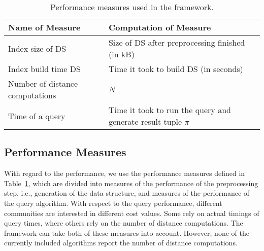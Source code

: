 
\begin{table}[t]
    \begin{tabular}{l l}
        \textbf{Name of Measure} & \textbf{Computation of Measure} \\ \hline \hline
        Index size of DS & Size of DS after preprocessing finished (in kB) \\
        Index build time DS & Time it took to build DS  (in seconds) \\ \hline
        Number of distance computations &  $N$ \\
        Time of a query & Time it took to run the query and generate result tuple $\pi$ \\[1em]
\end{tabular}%
    \caption{Performance measures used in the framework.}
    \label{tab:performance:measures}
\end{table}
%
\subsection{Performance Measures}

With regard to the performance, we use the performance measures defined
in Table~\ref{tab:performance:measures}, which are divided 
into measures of the performance of the preprocessing step,
i.e., generation of the data structure, and measures of the performance 
of the query algorithm. With respect to the query performance, different
communities are interested in different cost values. Some rely on 
actual timings of query times, where others rely on the number of distance
computations. The framework can take both of
these measures into account. However, none of the currently included 
algorithms report the number of distance computations.
